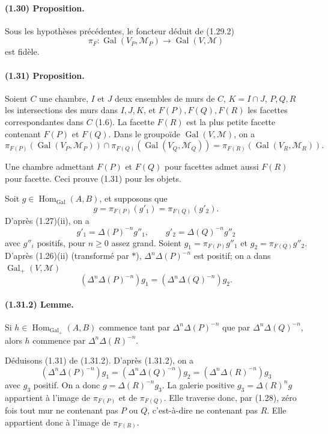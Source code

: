 \documentclass[10pt,a4paper]{article}
\begin{document}
\paragraph{(1.30) Proposition.} Sous les hypothèses précédentes, le foncteur déduit de (1.29.2)
\[
\pi_F:\operatorname{Gal}(V_P,\mathcal M_P)\longrightarrow\operatorname{Gal}(V,\mathcal M)
\]
est fidèle.

\paragraph{(1.31) Proposition.} Soient \(C\) une chambre, \(I\) et \(J\) deux ensembles de murs de \(C\), \(K=I\cap J\), \(P,Q,R\) les intersections des murs dans \(I,J,K\), et \(F(P),F(Q),F(R)\) les facettes correspondantes dans \(C\) (1.6). La facette \(F(R)\) est la plus petite facette contenant \(F(P)\) et \(F(Q)\). Dans le groupoïde \(\operatorname{Gal}(V,\mathcal M)\), on a
\[
\pi_{F(P)}(\operatorname{Gal}(V_P,\mathcal M_P))\cap
\pi_{F(Q)}(\operatorname{Gal}(V_Q,\mathcal M_Q))
=
\pi_{F(R)}(\operatorname{Gal}(V_R,\mathcal M_R)).
\]

Une chambre admettant \(F(P)\) et \(F(Q)\) pour facettes admet aussi \(F(R)\) pour facette. Ceci prouve (1.31) pour les objets.

Soit \(g\in\operatorname{Hom}_{\operatorname{Gal}}(A,B)\), et supposons que
\[
g=\pi_{F(P)}(g'_1)=\pi_{F(Q)}(g'_2).
\]
D'après (1.27)(ii), on a
\[
g'_1=\Delta(P)^{-n}g''_1,\qquad
g'_2=\Delta(Q)^{-n}g''_2
\]
avec \(g''_i\) positifs, pour \(n\ge0\) assez grand. Soient \(g_1=\pi_{F(P)}g''_1\) et \(g_2=\pi_{F(Q)}g''_2\). D'après (1.26)(ii) (transformé par \(*\)), \(\Delta^n\Delta(P)^{-n}\) est positif; on a dans \(\operatorname{Gal}_+(V,\mathcal M)\)
\[
\tag{1.31.1}
(\Delta^n\Delta(P)^{-n})g_1=(\Delta^n\Delta(Q)^{-n})g_2.
\]

\paragraph{(1.31.2) Lemme.} Si \(h\in\operatorname{Hom}_{\operatorname{Gal}_+}(A,B)\) commence tant par \(\Delta^n\Delta(P)^{-n}\) que par \(\Delta^n\Delta(Q)^{-n}\), alors \(h\) commence par \(\Delta^n\Delta(R)^{-n}\).

Déduisons (1.31) de (1.31.2). D'après (1.31.2), on a
\[
(\Delta^n\Delta(P)^{-n})g_1=(\Delta^n\Delta(Q)^{-n})g_2=(\Delta^n\Delta(R)^{-n})g_3
\]
avec \(g_3\) positif. On a donc \(g=\Delta(R)^{-n}g_3\). La galerie positive \(g_3=\Delta(R)^n g\) appartient à l'image de \(\pi_{F(P)}\) et de \(\pi_{F(Q)}\). Elle traverse donc, par (1.28), zéro fois tout mur ne contenant pas \(P\) ou \(Q\), c'est-à-dire ne contenant pas \(R\). Elle appartient donc à l'image de \(\pi_{F(R)}\).
\end{document}
